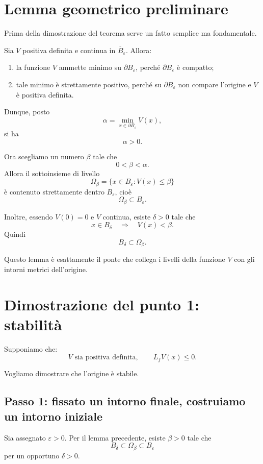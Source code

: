 \section{Lemma geometrico preliminare}

Prima della dimostrazione del teorema serve un fatto semplice ma fondamentale.

Sia \(V\) positiva definita e continua in \(\overline{B}_\varepsilon\). Allora:
\begin{enumerate}
    \item la funzione \(V\) ammette minimo su \(\partial B_\varepsilon\), perché \(\partial B_\varepsilon\) è compatto;
    \item tale minimo è strettamente positivo, perché su \(\partial B_\varepsilon\) non compare l'origine e \(V\) è positiva definita.
\end{enumerate}

Dunque, posto
\[
\alpha = \min_{x\in \partial B_\varepsilon} V(x),
\]
si ha
\[
\alpha>0.
\]

Ora scegliamo un numero \(\beta\) tale che
\[
0<\beta<\alpha.
\]
Allora il sottoinsieme di livello
\[
\Omega_\beta=\{x\in B_\varepsilon:V(x)\le \beta\}
\]
è contenuto strettamente dentro \(B_\varepsilon\), cioè
\[
\Omega_\beta \subset B_\varepsilon.
\]

Inoltre, essendo \(V(0)=0\) e \(V\) continua, esiste \(\delta>0\) tale che
\[
x\in B_\delta \quad \Longrightarrow \quad V(x)<\beta.
\]
Quindi
\[
B_\delta\subset \Omega_\beta.
\]

\medskip

\noindent
Questo lemma è esattamente il ponte che collega i livelli della funzione \(V\) con gli intorni metrici dell'origine.

\section{Dimostrazione del punto 1: stabilità}

Supponiamo che:
\[
V \text{ sia positiva definita},
\qquad
L_fV(x)\le 0.
\]

Vogliamo dimostrare che l'origine è stabile.

\subsection*{Passo 1: fissato un intorno finale, costruiamo un intorno iniziale}
Sia assegnato \(\varepsilon>0\).  
Per il lemma precedente, esiste \(\beta>0\) tale che
\[
B_\delta \subset \Omega_\beta \subset B_\varepsilon
\]
per un opportuno \(\delta>0\).

